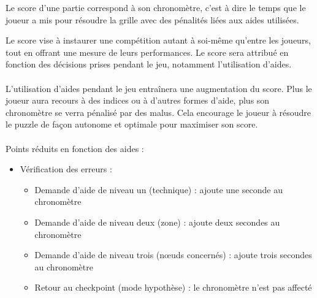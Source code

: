 {
    Le score d'une partie correspond à son chronomètre, c'est à dire le temps que le joueur a mis pour résoudre la grille avec des pénalités liées aux aides utilisées.
}
{
    Le score vise à instaurer une compétition autant à soi-même qu'entre les joueurs, tout en offrant une mesure de leurs performances. Le score sera attribué en fonction des décisions prises pendant le jeu, notamment l'utilisation d'aides.
    \\
    \\
    L'utilisation d'aides pendant le jeu entraînera une augmentation du score. Plus le joueur aura recours à des indices ou à d'autres formes d'aide, plus son chronomètre se verra pénalisé par des malus. Cela encourage le joueur à résoudre le puzzle de façon autonome et optimale pour maximiser son score.
    \\
    \\
    Points réduits en fonction des aides :
    \noexpand\begin{itemize}[label=$\Rightarrow$]
        \noexpand\item Vérification des erreurs :
            \noexpand\begin{itemize}
                \noexpand\item Demande d'aide de niveau un (technique) : ajoute une seconde au chronomètre
                \noexpand\item Demande d'aide de niveau deux (zone) : ajoute deux secondes au chronomètre
                \noexpand\item Demande d'aide de niveau trois (nœuds concernés) : ajoute trois secondes au chronomètre
                \noexpand\item Retour au checkpoint (mode hypothèse) : le chronomètre n'est pas affecté
            \noexpand\end{itemize}
    \noexpand\end{itemize}
}